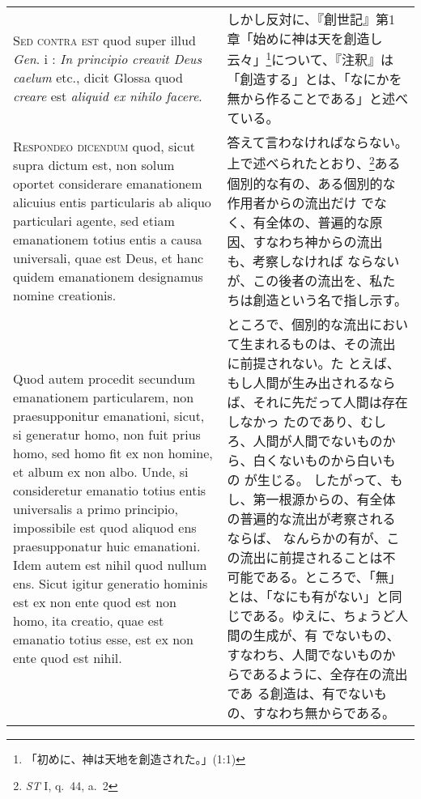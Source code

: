 \documentclass[10pt]{jsarticle} %
\begin{document}
\begin{longtable}{p{21em}p{21em}}
\\

{\scshape Sed contra est} quod super illud {\it Gen}. {\sc i} : {\it In principio
 creavit Deus caelum} etc., dicit Glossa quod {\it creare} est {\it aliquid ex nihilo facere}.


&

しかし反対に、『創世記』第1章「始めに神は天を創造し云々」\footnote
{「初めに、神は天地を創造された。」(1:1)
}について、『注釈』は
 「創造する」とは、「なにかを無から作ることである」と述べている。

\\

{\scshape Respondeo dicendum} quod, sicut supra dictum est, non solum oportet
 considerare emanationem alicuius entis particularis ab aliquo
 particulari agente, sed etiam emanationem totius entis a causa
 universali, quae est Deus, et hanc quidem emanationem designamus nomine
 creationis. 

&

答えて言わなければならない。
上で述べられたとおり、\footnote{{\itshape ST} I, q.~44, a.~2}ある個別的な有の、ある個別的な作用者からの流出だけ
 でなく、有全体の、普遍的な原因、すなわち神からの流出も、考察しなければ
 ならないが、この後者の流出を、私たちは創造という名で指し示す。

\\

Quod autem procedit secundum emanationem particularem, non
 praesupponitur emanationi, sicut, si generatur homo, non fuit prius
 homo, sed homo fit ex non homine, et album ex non albo. Unde, si
 consideretur emanatio totius entis universalis a primo principio,
 impossibile est quod aliquod ens praesupponatur huic emanationi. Idem
 autem est nihil quod nullum ens. Sicut igitur generatio hominis est ex
 non ente quod est non homo, ita creatio, quae est emanatio totius esse,
 est ex non ente quod est nihil.

&

ところで、個別的な流出において生まれるものは、その流出に前提されない。た
 とえば、もし人間が生み出されるならば、それに先だって人間は存在しなかっ
 たのであり、むしろ、人間が人間でないものから、白くないものから白いもの
 が生じる。
したがって、もし、第一根源からの、有全体の普遍的な流出が考察されるならば、
 なんらかの有が、この流出に前提されることは不可能である。ところで、「無」
 とは、「なにも有がない」と同じである。ゆえに、ちょうど人間の生成が、有
 でないもの、すなわち、人間でないものからであるように、全存在の流出であ
 る創造は、有でないもの、すなわち無からである。
 


\end{longtable}
\end{document}
